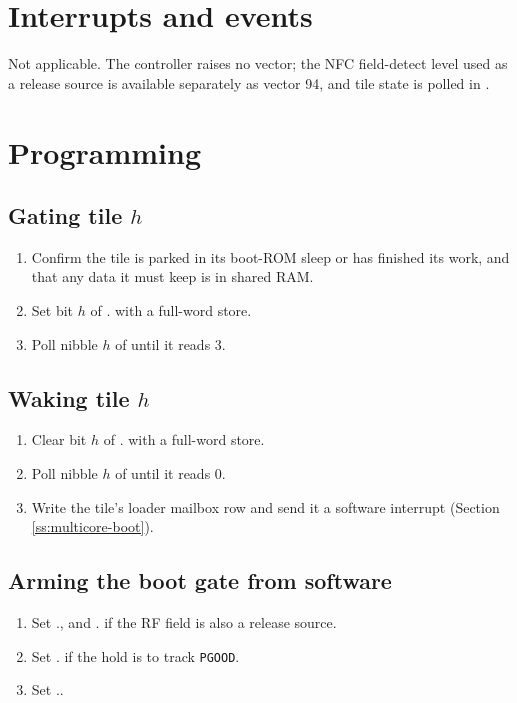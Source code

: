 \section{Interrupts and events}

Not applicable. The controller raises no vector; the NFC field-detect level used as a release source is available separately as  vector 94, and tile state is polled in .

\section{Programming}

\subsection{Gating tile $h$}

\begin{enumerate}
	\item Confirm the tile is parked in its boot-ROM sleep or has finished its work, and that any data it must keep is in shared RAM.
	\item Set bit $h$ of . with a full-word store.
	\item Poll nibble $h$ of  until it reads 3.
\end{enumerate}

\subsection{Waking tile $h$}

\begin{enumerate}
	\item Clear bit $h$ of . with a full-word store.
	\item Poll nibble $h$ of  until it reads 0.
	\item Write the tile's loader mailbox row and send it a software interrupt (Section \ref{ss:multicore-boot}).
\end{enumerate}

\subsection{Arming the boot gate from software}

\begin{enumerate}
	\item Set ., and . if the RF field is also a release source.
	\item Set . if the hold is to track \texttt{PGOOD}.
	\item Set ..
\end{enumerate}

